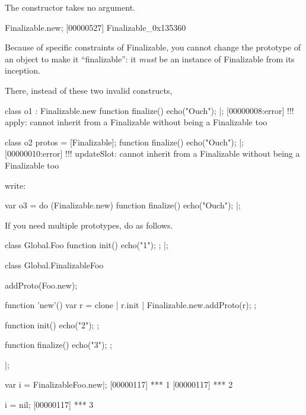 The constructor takes no argument.

\begin{urbiscript}
Finalizable.new;
[00000527] Finalizable_0x135360
\end{urbiscript}

\bigskip

Because of specific constraints of Finalizable, you cannot change the
prototype of an object to make it ``finalizable'': it \emph{must} be an
instance of Finalizable from its inception.

There, instead of these two invalid constructs,

\begin{multicols}{2}
\begin{urbiscript}
class o1 : Finalizable.new
{
  function finalize()
  {
    echo("Ouch");
  }
}|;
[00000008:error] !!! apply: cannot inherit from a Finalizable without being a Finalizable too
\end{urbiscript}

\begin{urbiscript}
class o2
{
  protos = [Finalizable];
  function finalize()
  {
    echo("Ouch");
  }
}|;
[00000010:error] !!! updateSlot: cannot inherit from a Finalizable without being a Finalizable too
\end{urbiscript}
\end{multicols}

write:

\begin{urbiscript}
var o3 =
  do (Finalizable.new)
  {
    function finalize()
    {
      echo("Ouch");
    }
  }|;
\end{urbiscript}

\bigskip

If you need multiple prototypes, do as follows.

\begin{urbiscript}
class Global.Foo
{
  function init()
  {
    echo("1");
  };
}|;

class Global.FinalizableFoo
{
  addProto(Foo.new);

  function 'new'()
  {
    var r = clone |
    r.init |
    Finalizable.new.addProto(r);
  };

  function init()
  {
    echo("2");
  };

  function finalize()
  {
    echo("3");
  };

}|;

var i = FinalizableFoo.new|;
[00000117] *** 1
[00000117] *** 2

i = nil;
[00000117] *** 3
\end{urbiscript}



